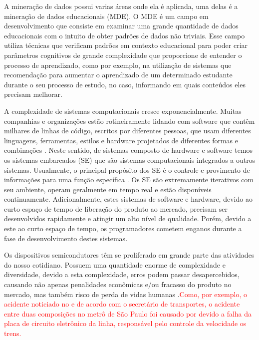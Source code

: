 \par
A mineração de dados possui varias áreas onde ela é aplicada, uma delas é a mineração de dados educacionais (MDE). O MDE é um campo em desenvolvimento que consiste em examinar uma grande quantidade de dados educacionais com o intuito de obter padrões de dados não triviais. Esse campo utiliza técnicas que verificam padrões em contexto educacional para poder criar parâmetros cognitivos de grande complexidade que proporcione de entender o processo de aprendizado, como por exemplo, na utilização de sistemas que recomendação para aumentar o aprendizado de um determinado estudante durante o seu processo de estudo, no caso, informando em quais conteúdos eles precisam melhorar.

\par





A complexidade de sistemas computacionais cresce exponencialmente. Muitas companhias e organizações estão rotineiramente lidando com software que contêm milhares de linhas de código, escritos por diferentes pessoas, que usam diferentes linguagens, ferramentas, estilos e hardware projetados de diferentes formas e combinações \cite{hoder2011case}. Neste sentido, de sistemas composto de hardware e software temos os sistemas embarcados (SE) que são sistemas computacionais integrados a outros sistemas. Usualmente, o principal propósito dos SE é o controle e provimento de informações para uma função específica \cite{ramesh2012energy}. Os SE são extremamente iterativos com seu ambiente, operam geralmente em tempo real e estão disponíveis continuamente. Adicionalmente, estes sistemas de software e hardware, devido ao curto espaço de tempo de liberação do produto ao mercado, precisam ser desenvolvidos rapidamente e atingir um alto nível de qualidade. Porém, devido a este ao curto espaço de tempo, os programadores cometem enganos durante a fase de desenvolvimento destes sistemas.

\par
Os dispositivos semicondutores têm se proliferado em grande parte das atividades do nosso cotidiano. Possuem uma quantidade enorme de complexidade e diversidade, devido a esta complexidade, erros podem passar desapercebidos, causando não apenas penalidades econômicas e/ou fracasso do produto no mercado, mas também risco de perda de vidas humanas \cite{cabodi2016hardware}.\textcolor{red}{Como, por exemplo, o acidente noticiado no \cite{g1Acidente} e de acordo com o secretário de transportes, o acidente entre duas composições no metrô de São Paulo foi causado por devido a falha da placa de circuito eletrônico da linha, responsável pelo controle da velocidade os trens.}

